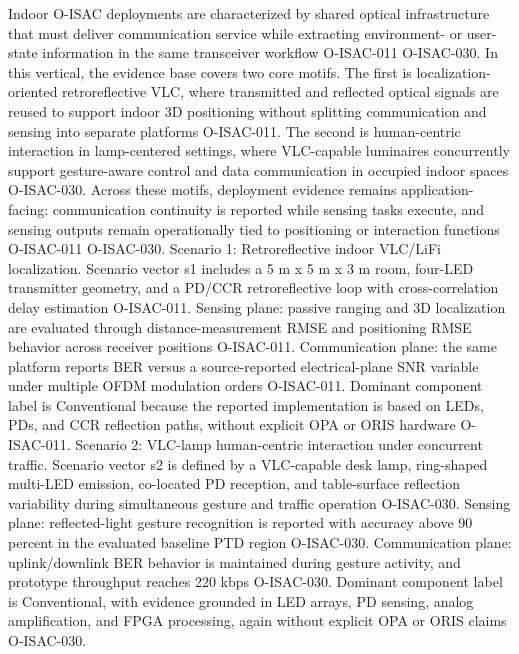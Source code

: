 {}
\markdownRendererSectionEnd 
\markdownRendererSectionEnd \markdownRendererSectionBegin
{}\markdownRendererInterblockSeparator
{}\markdownRendererSectionBegin
{}\markdownRendererInterblockSeparator
{}Indoor O-ISAC deployments are characterized by shared optical infrastructure that must deliver communication service while extracting environment- or user-state information in the same transceiver workflow O-ISAC-011 O-ISAC-030. In this vertical, the evidence base covers two core motifs. The first is localization-oriented retroreflective VLC, where transmitted and reflected optical signals are reused to support indoor 3D positioning without splitting communication and sensing into separate platforms O-ISAC-011. The second is human-centric interaction in lamp-centered settings, where VLC-capable luminaires concurrently support gesture-aware control and data communication in occupied indoor spaces O-ISAC-030. Across these motifs, deployment evidence remains application-facing: communication continuity is reported while sensing tasks execute, and sensing outputs remain operationally tied to positioning or interaction functions O-ISAC-011 O-ISAC-030.\markdownRendererInterblockSeparator
{}
\markdownRendererSectionEnd \markdownRendererSectionBegin
{}\markdownRendererInterblockSeparator
{}Scenario 1: Retroreflective indoor VLC/LiFi localization.\markdownRendererHardLineBreak
{}Scenario vector s1 includes a 5 m x 5 m x 3 m room, four-LED transmitter geometry, and a PD/CCR retroreflective loop with cross-correlation delay estimation O-ISAC-011. Sensing plane: passive ranging and 3D localization are evaluated through distance-measurement RMSE and positioning RMSE behavior across receiver positions O-ISAC-011. Communication plane: the same platform reports BER versus a source-reported electrical-plane SNR variable under multiple OFDM modulation orders O-ISAC-011. Dominant component label is Conventional because the reported implementation is based on LEDs, PDs, and CCR reflection paths, without explicit OPA or ORIS hardware O-ISAC-011.\markdownRendererParagraphSeparator
{}Scenario 2: VLC-lamp human-centric interaction under concurrent traffic.\markdownRendererHardLineBreak
{}Scenario vector s2 is defined by a VLC-capable desk lamp, ring-shaped multi-LED emission, co-located PD reception, and table-surface reflection variability during simultaneous gesture and traffic operation O-ISAC-030. Sensing plane: reflected-light gesture recognition is reported with accuracy above 90 percent in the evaluated baseline PTD region O-ISAC-030. Communication plane: uplink/downlink BER behavior is maintained during gesture activity, and prototype throughput reaches 220 kbps O-ISAC-030. Dominant component label is Conventional, with evidence grounded in LED arrays, PD sensing, analog amplification, and FPGA processing, again without explicit OPA or ORIS claims O-ISAC-030.\markdownRendererParagraphSeparator
